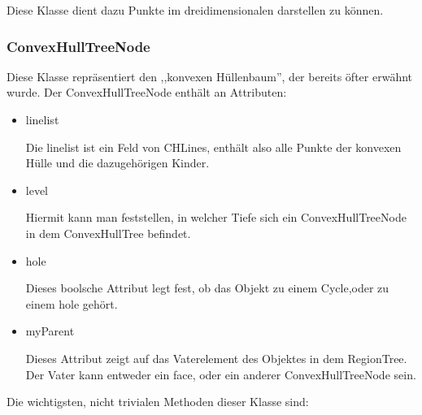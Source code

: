 Diese Klasse dient dazu Punkte im dreidimensionalen darstellen zu können.

\subsubsection{ConvexHullTreeNode}

Diese Klasse repräsentiert den ,,konvexen Hüllenbaum'', der bereits öfter erwähnt wurde. Der ConvexHullTreeNode enthält an Attributen:

\begin{itemize}
\item linelist

Die linelist ist ein Feld von CHLines, enthält also alle Punkte der konvexen Hülle und die dazugehörigen Kinder.

\item level

Hiermit kann man feststellen, in welcher Tiefe sich ein ConvexHullTreeNode in dem ConvexHullTree befindet.

\item hole

Dieses boolsche Attribut legt fest, ob das Objekt zu einem Cycle,oder zu einem hole gehört.

\item myParent

Dieses Attribut zeigt auf das Vaterelement des Objektes in dem RegionTree. Der Vater kann entweder ein face, oder ein anderer ConvexHullTreeNode sein.

\end{itemize}

Die wichtigsten, nicht trivialen Methoden dieser Klasse sind:

